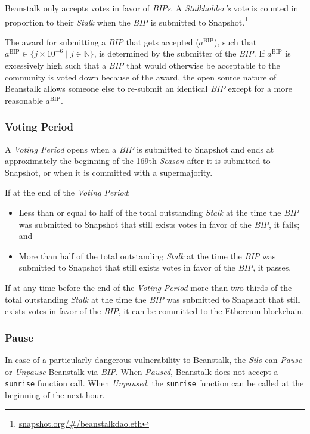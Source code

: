 \documentclass[tikz]{article}
\newcommand{\code}[1]{\texttt{#1}}
\newcommand{\term}[1]{\textsl{#1}}
\newcommand{\fref}[1]{\footnote{\href{http://#1}{#1}}}
\begin{document}
Beanstalk only accepts votes in favor of \term{BIPs}. A \term{Stalkholder's} vote is counted in proportion to their \term{Stalk} when the \term{BIP} is submitted to Snapshot.\fref{snapshot.org/\#/beanstalkdao.eth}

The award for submitting a \term{BIP} that gets accepted ($a^{\text{BIP}}$), such that $a^{\text{BIP}} \in \{j \times 10^{-6} \mid j \in \mathbb{N} \}$, is determined by the submitter of the \term{BIP}. If $a^{\text{BIP}}$ is excessively high such that a \term{BIP} that would otherwise be acceptable to the community is voted down because of the award, the open source nature of Beanstalk allows someone else to re-submit an identical \term{BIP} except for a more reasonable $a^{\text{BIP}}$.

\subsubsection{Voting Period}
\vspace*{-1mm}
A \term{Voting Period} opens when a \term{BIP} is submitted to Snapshot and ends at approximately the beginning of the 169th \term{Season} after it is submitted to Snapshot, or when it is committed with a supermajority.

If at the end of the \term{Voting Period}:
\begin{itemize}[midsep]
    \item Less than or equal to half of the total outstanding \term{Stalk} at the time the \term{BIP} was submitted to Snapshot that still exists votes in favor of the \term{BIP}, it fails; and
    \item More than half of the total outstanding \term{Stalk} at the time the \term{BIP} was submitted to Snapshot that still exists votes in favor of the \term{BIP}, it passes.
\end{itemize}

If at any time before the end of the \term{Voting Period} more than two-thirds of the total outstanding \term{Stalk} at the time the \term{BIP} was submitted to Snapshot that still exists votes in favor of the \term{BIP}, it can be committed to the Ethereum blockchain.

\subsubsection{Pause}
In case of a particularly dangerous vulnerability to Beanstalk, the \term{Silo} can \term{Pause} or \term{Unpause} Beanstalk via \term{BIP}. When \term{Paused}, Beanstalk does not accept a \code{sunrise} function call. When \term{Unpaused}, the \code{sunrise} function can be called at the beginning of the next hour.
\end{document}
